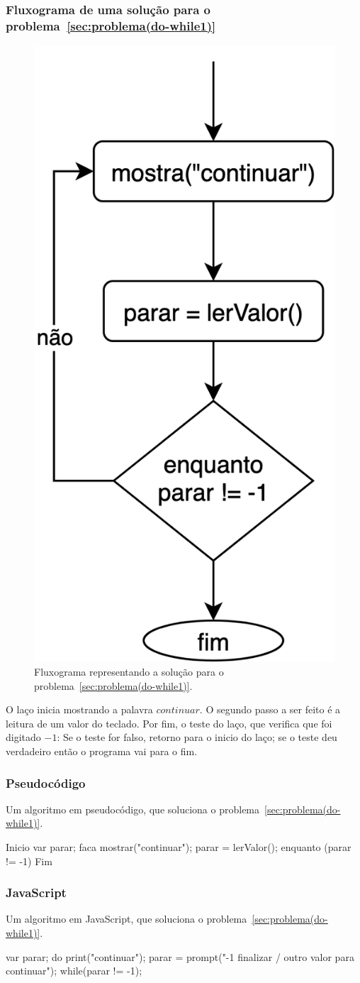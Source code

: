 \subsubsection*{Fluxograma de uma solução para o problema~\ref{sec:problema(do-while1)} }
\begin{figure}[h]
  \begin{center}
    \includegraphics[width=0.4\linewidth]{img/problemaDoWhile1.png}
    \caption{Fluxograma representando a solução para o problema~\ref{sec:problema(do-while1)}.}
    \label{fig:problemaDoWhile1}
  \end{center}
\end{figure}

O laço inicia mostrando a palavra $continuar$. O segundo passo a ser feito é a leitura de um valor do teclado. Por fim, o teste do laço, que verifica que foi digitado $-1$: Se o teste for falso, retorno para o inicio do laço; se o teste deu verdadeiro então o programa vai para o fim.


\subsubsection*{Pseudocódigo}
Um algoritmo em pseudocódigo, que soluciona o problema~\ref{sec:problema(do-while1)}.
\begin{pseudocode}
Inicio
var parar;
faca
	mostrar("continuar");
	parar = lerValor();
enquanto (parar != -1)
Fim
\end{pseudocode}


\subsubsection*{JavaScript}
Um algoritmo em JavaScript, que soluciona o problema~\ref{sec:problema(do-while1)}.
\begin{code}
var parar;
do{
	print("continuar");
	parar = prompt("-1 finalizar / outro valor para continuar");
}
while(parar != -1);
\end{code}

